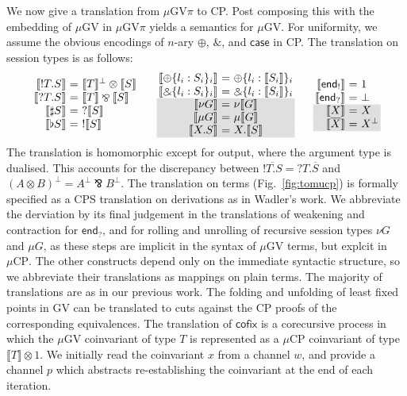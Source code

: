 \documentclass[orivec,envcountsame]{llncs}
\makeatletter
\newcommand{\with}{\mathbin\binampersand}
\newcommand{\parr}{\mathbin\bindnasrepma}
\newcommand{\cpdual}[1]{#1^\perp}
\newcommand{\cpbang}[1]{{! #1}}
\newcommand{\cpquery}[1]{{? #1}}
\newcommand{\gvdual}[1]{\overline{#1}}
\newcommand{\gvout}[2]{{!#1.#2}}
\newcommand{\gvin}[2]{{?#1.#2}}
\newcommand{\outterm}{\mkwd{end}_!}
\newcommand{\interm}{\mkwd{end}_?}
\newcommand{\gvserver}[1]{\flat #1}
\newcommand{\gvservice}[1]{\sharp #1}
\newcommand{\mkwd}[1]{\mathsf{#1}}
\newcommand{\lrkwd}{\mkwd{cofix}}
\newcommand{\key}{\mkwd}
\newcommand{\cofix}{\lrkwd}
\newcommand{\tocp}[1]{\llbracket #1 \rrbracket}
\newcommand{\mucp}{$\mu\mathrm{CP}$\xspace}
\newcommand{\mugv}{$\mu\mathrm{GV}$\xspace}
\newcommand{\gvpi}{$\mu\mathrm{GV}\pi$\xspace}
\newcommand{\ba}{\begin{array}}
\newcommand{\ea}{\end{array}}
\newenvironment{eqs}{\ba{@{}r@{~}c@{~}l@{}}}{\ea}
\newcommand\shaderow{\noalign{\vskip-0.4pt}\rowcolor{shade}[0.6mm]}
\makeatother
\begin{document}
We now give a translation from \gvpi to CP. Post composing this with the embedding of \mugv in \gvpi
yields a semantics for \mugv. For uniformity, we assume the obvious encodings of $n$-ary $\oplus$,
$\with$, and $\key{case}$ in CP. The translation on session types is as follows: \small\[
\ba{@{}c@{\qquad}c@{\qquad}c@{}}
\begin{eqs}
\tocp{\gvout{T}{S}}        &=& \cpdual{\tocp{T}} \otimes \tocp{S} \\
\tocp{\gvin{T}{S}}         &=& \tocp{T} \parr \tocp{S} \\
\tocp{\gvservice{S}}       &=& \cpquery{\tocp{S}} \\
\tocp{\gvserver{S}}        &=& \cpbang{\tocp{S}} \\
\end{eqs}
&
\begin{eqs}
\tocp{\oplus \{l_i:S_i \}_i} &=& \oplus \{l_i:\tocp{S_i}\}_i \\
\tocp{\with \{l_i:S_i \}_i}  &=& \with \{l_i:\tocp{S_i}\}_i \\ \shaderow
\tocp{\nu G}                &=& \nu\tocp{G} \\ \shaderow
\tocp{\mu G}                &=& \mu\tocp{G} \\ \shaderow
\tocp{X.S}                  &=& X.\tocp{S} \\
\end{eqs}
&
\begin{eqs}
\tocp{\outterm}            &=& 1 \\
\tocp{\interm}             &=& \bot \\ \shaderow
\tocp{X}                   &=& X \\ \shaderow
\tocp{\gvdual{X}}          &=& \cpdual{X} \\
\end{eqs}\\
\ea
\]\normalsize
The translation is homomorphic except for output, where the argument type is dualised. This accounts
for the discrepancy between $\gvdual{\gvout{T}{S}} = \gvin{T}{\gvdual{S}}$ and $\cpdual{(A \otimes
  B)} = \cpdual{A} \parr \cpdual{B}.$
%
The translation on terms (Fig.~\ref{fig:tomucp}) is formally specified as a CPS translation on
derivations as in Wadler's work. We abbreviate the derviation by its final judgement in the
translations of weakening and contraction for $\interm$, and for rolling and unrolling of recursive
session types $\nu G$ and $\mu G$, as these steps are implicit in the syntax of \mugv terms, but
explcit in \mucp. The other constructs depend only on the immediate syntactic structure, so we
abbreviate their translations as mappings on plain terms. The majority of translations are as in our
previous work. The folding and unfolding of least fixed points in GV can be translated to cuts
against the CP proofs of the corresponding equivalences. The translation of $\cofix$ is a
corecursive process in which the \mugv coinvariant of type $T$ is represented as a \mucp coinvariant
of type $\tocp{T} \otimes 1$.  We initially read the coinvariant $x$ from a channel $w$, and provide
a channel $p$ which abstracts re-establishing the coinvariant at the end of each iteration.
\end{document}
